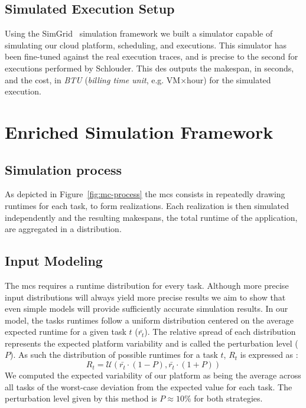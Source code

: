 \documentclass[10pt,conference,compsocconf]{IEEEtran}
\begin{document}
\subsection{Simulated Execution Setup}
Using the SimGrid~\cite{simgrid} simulation framework we built a simulator
capable of simulating our cloud platform, scheduling, and executions. This
simulator has been fine-tuned against the real execution traces, and is precise
to the second for executions performed by Schlouder. This \ac{des} outputs the
makespan, in seconds, and the cost, in \emph{BTU} (\emph{billing time unit},
e.g. VM$\times$hour) for the simulated execution.

\section{Enriched Simulation Framework}\label{sec:enriched-sim}

\subsection{Simulation process}


As depicted in Figure~\ref{fig:mc-process} the \ac{mcs} consists in repeatedly
drawing runtimes for each task, to form realizations. Each realization is then
simulated independently and the resulting makespans, the total runtime of the
application, are aggregated in a distribution. 

\subsection{Input Modeling}\label{sec:im}
The \ac{mcs} requires a runtime distribution for every task. Although more
precise input distributions will always yield more precise results we aim to
show that even simple models will provide sufficiently accurate simulation
results. In our model, the tasks runtimes follow a uniform distribution centered
on the average expected runtime for a given task $t$ ($\bar{r_t}$). The relative
spread of each distribution represents the expected platform variability and is
called the perturbation level ($P$). As such the distribution of possible 
runtimes for a task $t$,  $R_t$ is expressed as :
\begin{equation}
	R_t=\mathcal{U}(\bar{r_t}\cdot{}(1-P), \bar{r_t}\cdot{}(1+P)) 
\end{equation}
We computed the expected variability of our platform as being the average across
all tasks of the worst-case deviation from the expected value for each task. The
perturbation level given by this method is $P\approx{}10\%$ for both strategies.
\end{document}
